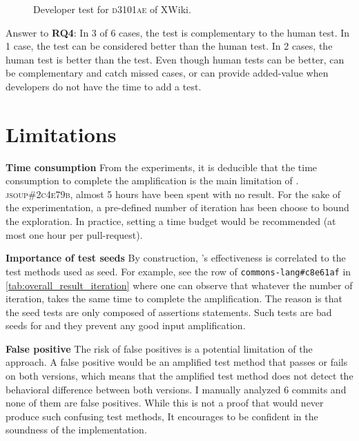 \begin{figure}[h]
\caption{Developer test for \textsc{d3101ae} of XWiki.}
\label{fig:diff_xwiki}
\end{figure}


\begin{mdframed}
Answer to \textbf{RQ4}: 
In 3 of 6 cases, the \DCI test is complementary to the human test.
In 1 case, the \DCI test can be considered better than the human test.
In 2 cases, the human test is better than the \DCI test.
Even though human tests can be better, \DCI can be complementary and catch missed cases, or can provide added-value when developers do not have the time to add a test.
\end{mdframed}



\section{Limitations}
\label{sec:dci:limitations}

\textbf{Time consumption}
From the experiments, it is deducible that the time consumption to complete the amplification is the main limitation of \DCI.
\textsc{jsoup\#2c4e79b}, almost 5 hours have been spent with no result.
For the sake of the experimentation, a pre-defined number of iteration has been choose to bound the exploration.
In practice, setting a time budget would be recommended (\eg at most one hour per pull-request).

\textbf{Importance of test seeds}
By construction, \DCI's effectiveness is correlated to the test methods used as seed.
For example, see the row of \texttt{commons-lang\#c8e61af} in \autoref{tab:overall_result_iteration}
where one can observe that whatever the number of iteration, \DCI takes the same time to complete the amplification.
The reason is that the seed tests are only composed of assertions statements.
Such tests are bad seeds for \DCI and they prevent any good input amplification.

\textbf{False positive}
The risk of false positives is a potential limitation of the approach.
A false positive would be an amplified test method that passes or fails on both versions, which means that the amplified test method does not detect the behavioral difference between both versions.
I manually analyzed 6 commits and none of them are false positives.
While this is not a proof that \DCI would never produce such confusing test methods, It encourages to be confident in the soundness of the implementation.

